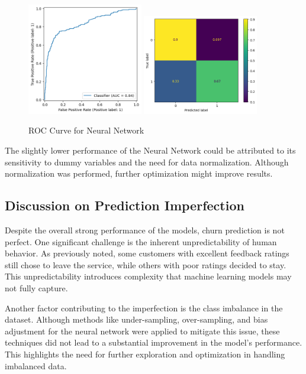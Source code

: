 \documentclass[12pt]{article}
\begin{document}
\begin{figure}[h!]
    \centering
    \includegraphics[width=0.45\textwidth]{figures/roc_curve_nn.png}
    \includegraphics[width=0.45\textwidth]{figures/confusion_matrix_nn.png}
    \caption{ROC Curve for Neural Network}
    \label{fig:roc_curve_nn}
\end{figure}

The slightly lower performance of the Neural Network could be attributed to its sensitivity to dummy variables and the need for data normalization. Although normalization was performed, further optimization might improve results.

\subsection{Discussion on Prediction Imperfection}

Despite the overall strong performance of the models, churn prediction is not perfect. One significant challenge is the inherent unpredictability of human behavior. As previously noted, some customers with excellent feedback ratings still chose to leave the service, while others with poor ratings decided to stay. This unpredictability introduces complexity that machine learning models may not fully capture.

Another factor contributing to the imperfection is the class imbalance in the dataset. Although methods like under-sampling, over-sampling, and bias adjustment for the neural network were applied to mitigate this issue, these techniques did not lead to a substantial improvement in the model's performance. This highlights the need for further exploration and optimization in handling imbalanced data.
\end{document}

